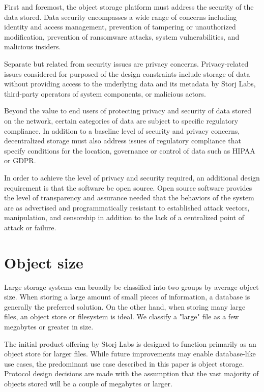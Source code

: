 \documentclass[11pt,fleqn,openany]{book}
\begin{document}
First and foremost, the object storage platform must address the security of
the data stored. Data security encompasses a wide range of concerns including
identity and access management, prevention of tampering or unauthorized
modification, prevention of ransomware attacks, system vulnerabilities, and
malicious insiders.

Separate but related from security issues are privacy concerns.
Privacy-related issues considered for purposed of the design constraints
include storage of data without providing access to the underlying data and its
metadata by Storj Labs, third-party operators of system components,
or malicious actors.

Beyond the value to end users of protecting privacy and security of data stored
on the network, certain categories of data are subject to specific regulatory
compliance. In addition to a baseline level of security and privacy concerns,
decentralized storage must also address issues of regulatory compliance that
specify conditions for the location, governance or control of data such as
HIPAA or GDPR.

In order to achieve the level of privacy and security required, an additional
design requirement is that the software be open source. Open source software
provides the level of transparency and assurance needed that the behaviors of
the system are as advertised and programmatically resistant to established
attack vectors, manipulation, and censorship in addition to the lack of a
centralized point of attack or failure.

\section{Object size}

Large storage systems can broadly be classified into two groups by average
object size. When storing a large amount of small pieces of information, a
database is generally the preferred solution.
On the other hand, when storing many large
files, an object store or filesystem is ideal. We classify a "large" file as a
few megabytes or greater in size.

The initial product offering by Storj Labs is designed to function primarily as
an object store for larger files. While future improvements may enable
database-like use cases, the predominant use case described in this paper is
object storage. Protocol design decisions are made with the assumption that the
vast majority of objects stored will be a couple of megabytes or larger.
\end{document}
